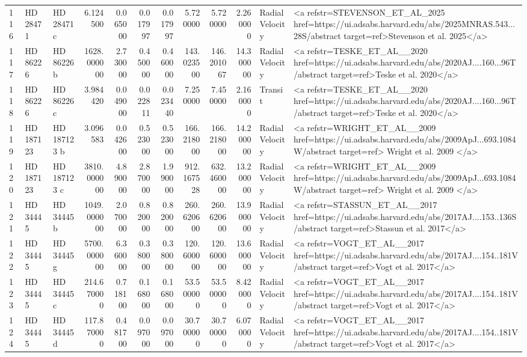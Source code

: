 \begin{tabular}{lllrrrrrrrll}
116 & HD 28471 & HD 28471 c & 6.124500 & 0.065000 & 0.017997 & 0.017997 & 5.720000 & 5.720000 & 2.260000 & Radial Velocity & <a refstr=STEVENSON_ET_AL_2025 href=https://ui.adsabs.harvard.edu/abs/2025MNRAS.543...28S/abstract target=ref>Stevenson et al. 2025</a> \\
117 & HD 86226 & HD 86226 b & 1628.000000 & 2.730000 & 0.450000 & 0.460000 & 143.023500 & 146.201067 & 14.300000 & Radial Velocity & <a refstr=TESKE_ET_AL__2020 href=https://ui.adsabs.harvard.edu/abs/2020AJ....160...96T/abstract target=ref>Teske et al. 2020</a> \\
118 & HD 86226 & HD 86226 c & 3.984420 & 0.049000 & 0.022811 & 0.023440 & 7.250000 & 7.450000 & 2.160000 & Transit & <a refstr=TESKE_ET_AL__2020 href=https://ui.adsabs.harvard.edu/abs/2020AJ....160...96T/abstract target=ref>Teske et al. 2020</a> \\
119 & HD 187123 & HD 187123 b & 3.096583 & 0.042600 & 0.523000 & 0.523000 & 166.218000 & 166.218000 & 14.200000 & Radial Velocity & <a refstr=WRIGHT_ET_AL__2009 href=https://ui.adsabs.harvard.edu/abs/2009ApJ...693.1084W/abstract target=ref> Wright et al. 2009 </a> \\
120 & HD 187123 & HD 187123 c & 3810.000000 & 4.890000 & 2.870000 & 1.990000 & 912.167528 & 632.460000 & 13.200000 & Radial Velocity & <a refstr=WRIGHT_ET_AL__2009 href=https://ui.adsabs.harvard.edu/abs/2009ApJ...693.1084W/abstract target=ref> Wright et al. 2009 </a> \\
121 & HD 34445 & HD 34445 b & 1049.000000 & 2.070000 & 0.820000 & 0.820000 & 260.620600 & 260.620600 & 13.900000 & Radial Velocity & <a refstr=STASSUN_ET_AL__2017 href=https://ui.adsabs.harvard.edu/abs/2017AJ....153..136S/abstract target=ref>Stassun et al. 2017</a> \\
122 & HD 34445 & HD 34445 g & 5700.000000 & 6.360000 & 0.380000 & 0.380000 & 120.600000 & 120.600000 & 13.600000 & Radial Velocity & <a refstr=VOGT_ET_AL__2017 href=https://ui.adsabs.harvard.edu/abs/2017AJ....154..181V/abstract target=ref>Vogt et al. 2017</a> \\
123 & HD 34445 & HD 34445 c & 214.670000 & 0.718100 & 0.168000 & 0.168000 & 53.500000 & 53.500000 & 8.420000 & Radial Velocity & <a refstr=VOGT_ET_AL__2017 href=https://ui.adsabs.harvard.edu/abs/2017AJ....154..181V/abstract target=ref>Vogt et al. 2017</a> \\
124 & HD 34445 & HD 34445 d & 117.870000 & 0.481700 & 0.097000 & 0.097000 & 30.700000 & 30.700000 & 6.070000 & Radial Velocity & <a refstr=VOGT_ET_AL__2017 href=https://ui.adsabs.harvard.edu/abs/2017AJ....154..181V/abstract target=ref>Vogt et al. 2017</a> \\

\end{tabular}

